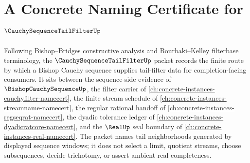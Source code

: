 \chapter{A Concrete Naming Certificate for $\CauchySequenceTailFilterUp$}
\label{ch:concrete-instances-cauchy-sequence-tail-filter-namecert}

Following Bishop--Bridges constructive analysis and Bourbaki--Kelley filterbase terminology, the $\CauchySequenceTailFilterUp$ packet records the finite route by which a Bishop Cauchy sequence supplies tail-filter data for completion-facing consumers. It sits between the sequence-side evidence of $\BishopCauchySequenceUp$, the filter carrier of \autoref{ch:concrete-instances-cauchyfilter-namecert}, the finite stream schedule of \autoref{ch:concrete-instances-streamname-namecert}, the regular rational handoff of \autoref{ch:concrete-instances-regseqrat-namecert}, the dyadic tolerance ledger of \autoref{ch:concrete-instances-dyadicratcore-namecert}, and the $\RealUp$ seal boundary of \autoref{ch:concrete-instances-real-namecert}. The packet names tail neighborhoods generated by displayed sequence windows; it does not select a limit, quotient streams, choose subsequences, decide trichotomy, or assert ambient real completeness.

